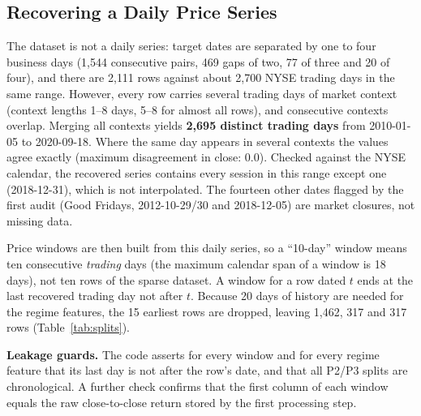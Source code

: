 \subsection{Recovering a Daily Price Series}\label{sec:windows}
The dataset is not a daily series: target dates are separated by one to four business days (1{,}544 consecutive pairs, 469 gaps of two, 77 of three and 20 of four), and there are 2{,}111 rows against about 2{,}700 NYSE trading days in the same range. However, every row carries several trading days of market context (context lengths 1--8 days, 5--8 for almost all rows), and consecutive contexts overlap. Merging all contexts yields \textbf{2{,}695 distinct trading days} from 2010-01-05 to 2020-09-18. Where the same day appears in several contexts the values agree exactly (maximum disagreement in close: 0.0). Checked against the NYSE calendar, the recovered series contains every session in this range except one (2018-12-31), which is not interpolated. The fourteen other dates flagged by the first audit (Good Fridays, 2012-10-29/30 and 2018-12-05) are market closures, not missing data.

Price windows are then built from this daily series, so a ``10-day'' window means ten consecutive \emph{trading} days (the maximum calendar span of a window is 18 days), not ten rows of the sparse dataset. A window for a row dated $t$ ends at the last recovered trading day not after $t$. Because 20 days of history are needed for the regime features, the 15 earliest rows are dropped, leaving 1{,}462, 317 and 317 rows (Table~\ref{tab:splits}).

\begin{warnbox}
\textbf{Leakage guards.} The code asserts for every window and for every regime feature that its last day is not after the row's date, and that all P2/P3 splits are chronological. A further check confirms that the first column of each window equals the raw close-to-close return stored by the first processing step.
\end{warnbox}

